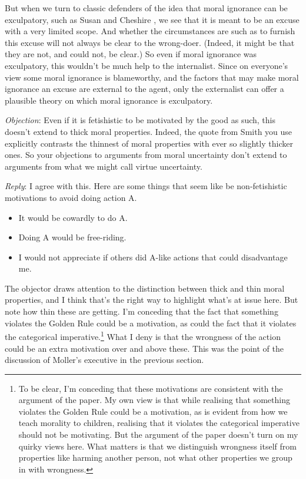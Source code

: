 But when we turn to classic defenders of the idea that moral ignorance can be exculpatory, such as Susan  \citet{Wolf1980} and Cheshire  \citet{Calhoun1989}, we see that it is meant to be an excuse with a very limited scope. And whether the circumstances are such as to furnish this excuse will not always be clear to the wrong-doer. (Indeed, it might be that they are not, and could not, be clear.) So even if moral ignorance was exculpatory, this wouldn't be much help to the internalist. Since on everyone's view some moral ignorance is blameworthy, and the factors that may make moral ignorance an excuse are external to the agent, only the externalist can offer a plausible theory on which moral ignorance is exculpatory.

\emph{Objection}: Even if it is fetishistic to be motivated by the good as such, this doesn't extend to thick moral properties. Indeed, the quote from Smith you use explicitly contrasts the thinnest of moral properties with ever so slightly thicker ones. So your objections to arguments from moral uncertainty don't extend to arguments from what we might call virtue uncertainty.

\emph{Reply}: I agree with this. Here are some things that seem like be non-fetishistic motivations to avoid doing action A.

\begin{itemize}
\item It would be cowardly to do A.

\item Doing A would be free-riding.

\item I would not appreciate if others did A-like actions that could disadvantage me.

\end{itemize}
The objector draws attention to the distinction between thick and thin moral properties, and I think that's the right way to highlight what's at issue here. But note how thin these are getting. I'm conceding that the fact that something violates the Golden Rule could be a motivation, as could the fact that it violates the categorical imperative.\footnote{To be clear, I'm conceding that these motivations are consistent with the argument of the paper. My own view is that while realising that something violates the Golden Rule could be a motivation, as is evident from how we teach morality to children, realising that it violates the categorical imperative should not be motivating. But the argument of the paper doesn't turn on my quirky views here. What matters is that we distinguish wrongness itself from properties like harming another person, not what other properties we group in with wrongness.} What I deny is that the wrongness of the action could be an extra motivation over and above these. This was the point of the discussion of Moller's executive in the previous section.

